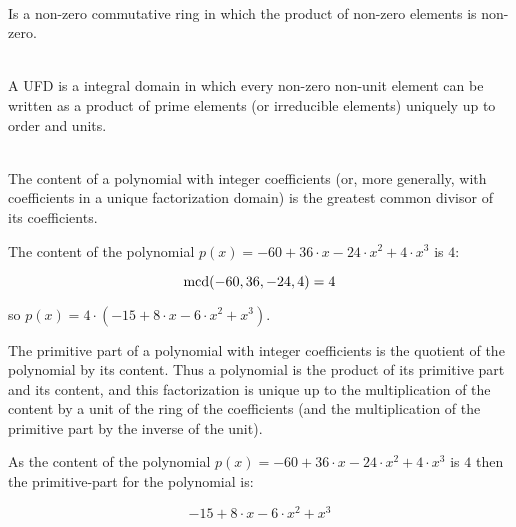 \begin{definition}
\ \\
Is a non-zero commutative ring in which the product of non-zero elements is non-zero.
\end{definition}

\begin{definition}
\ \\
A UFD is a integral domain in which every non-zero non-unit element can be written as a product of prime elements (or irreducible elements) uniquely up to order 
and units.
\end{definition}

\begin{definition}
\ \\
The content of a polynomial with integer coefficients (or, more generally, with coefficients in a unique factorization domain) is the greatest common divisor 
of its coefficients.
\end{definition}

\begin{example}
The content of the polynomial $p(x) = -60 + 36\cdot x - 24 \cdot x^2 + 4 \cdot x^3$ is $4$:

\begin{displaymath}
\rm{mcd}(-60,36,-24,4) = 4
\end{displaymath}

so $p(x) = 4\cdot (-15 + 8\cdot x - 6 \cdot x^2 + x^3)$.
\end{example}

\begin{definition}
The primitive part of a polynomial with integer coefficients is the quotient of the polynomial by its content. Thus a polynomial is the product of its primitive
part and its content, and this factorization is unique up to the multiplication of the content by a unit of the ring of the coefficients (and the multiplication
of the primitive part by the inverse of the unit). 
\end{definition}

\begin{example}
As the content of the polynomial $p(x) = -60 + 36\cdot x - 24 \cdot x^2 + 4 \cdot x^3$ is $4$ then the primitive-part for the polynomial is:

\begin{displaymath}
-15 + 8\cdot x - 6 \cdot x^2 + x^3
\end{displaymath}
\end{example}

